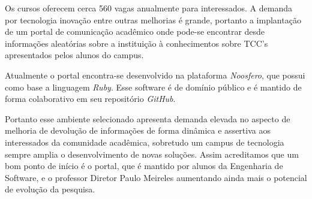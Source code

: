 	Os cursos oferecem cerca 560 vagas anualmente para interessados. A demanda por tecnologia inovação entre outras melhorias é grande, portanto a implantação de um portal de comunicação acadêmico onde pode-se encontrar desde informações aleatórias sobre a instituição à conhecimentos sobre TCC’s apresentados pelos alunos do campus. 

	Atualmente o portal encontra-se desenvolvido na plataforma \textit{Noosfero}, que possui como base a linguagem \textit{Ruby}. Esse software é de domínio público e é mantido de forma colaborativo em seu repositório \textit{GitHub}.

	Portanto esse ambiente selecionado apresenta demanda elevada no aspecto de melhoria de devolução de informações de forma dinâmica e assertiva aos interessados da comunidade acadêmica, sobretudo um campus de tecnologia sempre amplia o desenvolvimento de novas soluções. Assim acreditamos que um bom ponto de início é o portal, que é mantido por alunos da Engenharia de Software, e o professor Diretor Paulo Meireles aumentando ainda mais o potencial de evolução da pesquisa.
